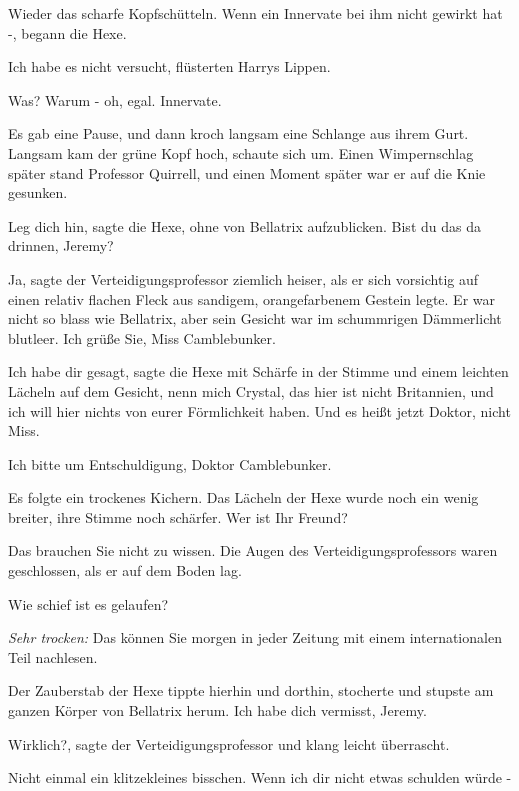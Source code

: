 Wieder das scharfe Kopfschütteln. \glqq Wenn ein Innervate bei ihm nicht gewirkt
hat -\grqq{}, begann die Hexe.

\glqq Ich habe es nicht versucht\grqq{}, flüsterten Harrys Lippen.

\glqq Was? Warum - oh, egal. Innervate.\grqq{}

Es gab eine Pause, und dann kroch langsam eine Schlange aus ihrem Gurt. Langsam
kam der grüne Kopf hoch, schaute sich um. Einen Wimpernschlag später stand
Professor Quirrell, und einen Moment später war er auf die Knie gesunken.

\glqq Leg dich hin\grqq{}, sagte die Hexe, ohne von Bellatrix aufzublicken.
\glqq Bist du das da drinnen, Jeremy?\grqq{}

\glqq Ja\grqq{}, sagte der Verteidigungsprofessor ziemlich heiser, als er sich
vorsichtig auf einen relativ flachen Fleck aus sandigem, orangefarbenem Gestein
legte. Er war nicht so blass wie Bellatrix, aber sein Gesicht war im schummrigen
Dämmerlicht blutleer. \glqq Ich grüße Sie, Miss Camblebunker.\grqq{}

\glqq Ich habe dir gesagt\grqq{}, sagte die Hexe mit Schärfe in der Stimme und
einem leichten Lächeln auf dem Gesicht, \glqq nenn mich Crystal, das hier ist
nicht Britannien, und ich will hier nichts von eurer Förmlichkeit haben. Und es
heißt jetzt Doktor, nicht Miss.\grqq{}

\glqq Ich bitte um Entschuldigung, Doktor Camblebunker.\grqq{}

Es folgte ein trockenes Kichern. Das Lächeln der Hexe wurde noch ein wenig
breiter, ihre Stimme noch schärfer. \glqq Wer ist Ihr Freund?\grqq{}

\glqq Das brauchen Sie nicht zu wissen.\grqq{} Die Augen des
Verteidigungsprofessors waren geschlossen, als er auf dem Boden lag.

\glqq Wie schief ist es gelaufen?\grqq{}

\emph{Sehr trocken:} \glqq Das können Sie morgen in jeder Zeitung mit einem
internationalen Teil nachlesen.\grqq{}

Der Zauberstab der Hexe tippte hierhin und dorthin, stocherte und stupste am
ganzen Körper von Bellatrix herum. \glqq Ich habe dich vermisst, Jeremy.\grqq{}

\glqq Wirklich?\grqq{}, sagte der Verteidigungsprofessor und klang leicht
überrascht.

\glqq Nicht einmal ein klitzekleines bisschen. Wenn ich dir nicht etwas schulden
würde -\grqq{}

